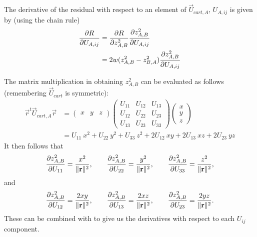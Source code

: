 \documentclass[11pt]{article}
\begin{document}
The derivative of the residual with respect to an element of $\vec{U}_{cart,A}$,
$U_{A,ij}$ is given by (using the chain rule)
\begin{align}
\frac{\partial R}{\partial U_{A,ij}} &= \frac{\partial R}{\partial z^2_{A,B}} \frac{\partial z^2_{A,B}}{\partial U_{A,ij}}\\
&=2w(z^2_{A,B} - z^2_{B,A}) \frac{\partial z^2_{A,B}}{\partial U_{A,ij}}\label{eqn:r_derivative}
\end{align}

The matrix multiplication in obtaining $z^2_{A,B}$ can be evaluated as follows
(remembering $\vec{U}_{cart}$ is symmetric):
\begin{align}
\vec{r}^t\vec{U}_{cart,A}\vec{r} &= 
\begin{pmatrix} x & y & z \end{pmatrix}
\begin{pmatrix} U_{11} & U_{12} & U_{13}\\
                         U_{12} & U_{22} & U_{23}\\
                         U_{13} & U_{23} & U_{33}\end{pmatrix}
\begin{pmatrix} x\\y\\z\end{pmatrix}\\
&= U_{11}\ x^2 + U_{22}\ y^2 + U_{33}\ z^2 + 2U_{12}\ xy + 2U_{13}\ xz + 2U_{23}\ yz
\end{align}
It then follows that
\begin{equation}
\frac{\partial z^2_{A,B}}{\partial U_{11}} = \frac{x^2}{\| \mathbf{r} \|^2} ,\qquad
\frac{\partial z^2_{A,B}}{\partial U_{22}} = \frac{y^2}{\| \mathbf{r} \|^2} ,\qquad
\frac{\partial z^2_{A,B}}{\partial U_{33}} = \frac{z^2}{\| \mathbf{r} \|^2} ,
\end{equation}
and
\begin{equation}
\frac{\partial z^2_{A,B}}{\partial U_{12}} = \frac{2xy}{\| \mathbf{r} \|^2} ,\qquad
\frac{\partial z^2_{A,B}}{\partial U_{13}} = \frac{2xz}{\| \mathbf{r} \|^2} ,\qquad
\frac{\partial z^2_{A,B}}{\partial U_{23}} = \frac{2yz}{\| \mathbf{r} \|^2} .
\end{equation}
These can be combined with  to give us the derivatives
with respect to each $U_{ij}$ component.


\end{document}
